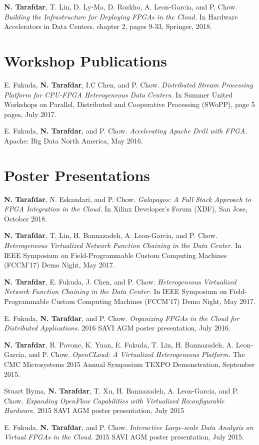 \onecol
{
    \textbf{N. Tarafdar}, T. Lin, D. Ly-Ma, D. Rozkho, A. Leon-Garcia, and P. Chow.
    \textit{Building the Infrastructure for Deploying FPGAs in the Cloud.}
    In Hardware Accelerators in Data Centers, chapter 2, pages 9-33, Springer, 2018.
}



\section{\sc Workshop Publications}

\onecol
{
  E. Fukuda, \textbf{N. Tarafdar}, I.C Chen, and P. Chow.
  \textit{Distributed Stream Processing Platform for CPU-FPGA Heterogeneous Data Centers.}
  In Summer United Workshops on Parallel, Distributed and Cooperative Processing (SWoPP), page 5 pages, July 2017.
}

\onecol
{
  E. Fukuda, \textbf{N. Tarafdar}, and P. Chow.
  \textit{Accelerating Apache Drill with FPGA.}
  Apache: Big Data North America, May 2016.
}


\section{\sc Poster Presentations}


\onecol
{
    \textbf{N. Tarafdar}, N. Eskandari, and P. Chow.
    \textit{Galapagos: A Full Stack Approach to FPGA Integration in the Cloud.}
    In Xilinx Developer's Forum (XDF), San Jose, October 2018. 
}



\onecol
{
    \textbf{N. Tarafdar}, T. Lin, H. Bannazadeh, A. Leon-Garcia, and P. Chow.
    \textit{Heterogeneous Virtualized Network Function Chaining in the Data Center.}
    In IEEE Symposium on Field-Programmable Custom Computing Machines (FCCM'17) Demo Night, May 2017. 
}


\onecol
{
    \textbf{N. Tarafdar}, E. Fukuda, J. Chen, and P. Chow.
    \textit{Heterogeneous Virtualized Network Function Chaining in the Data Center.}
    In IEEE Symposium on Field-Programmable Custom Computing Machines (FCCM'17) Demo Night, May 2017. 
}

\onecol
{
    E. Fukuda, \textbf{N. Tarafdar}, and P. Chow.
    \textit{Organizing FPGAs in the Cloud for Distributed Applications.}
    2016 SAVI AGM poster presentation, July 2016. 
}


\onecol
{
    \textbf{N. Tarafdar}, R. Pavone, K. Yuan, E. Fukuda, T. Lin, H. Bannazadeh, A. Leon-Garcia, and P. Chow. 
    \textit{OpenCLoud: A Virtualized Heterogeneous Platform.} 
    The CMC Microsystems 2015 Annual Symposium TEXPO Demonstration, September 2015. 
}

\onecol
{
    Stuart Byma, \textbf{N. Tarafdar}, T. Xu, H. Bannazadeh, A. Leon-Garcia, and P. Chow.
    \textit{Expanding OpenFlow Capabilities with Virtualized Reconfigurable Hardware.}
    2015 SAVI AGM poster presentation, July 2015
}


\onecol
{
    E. Fukuda, \textbf{N. Tarafdar}, and P. Chow.
    \textit{Interactive Large-scale Data Analysis on Virtual FPGAs in the Cloud.}
    2015 SAVI AGM poster presentation, July 2015. 

}


